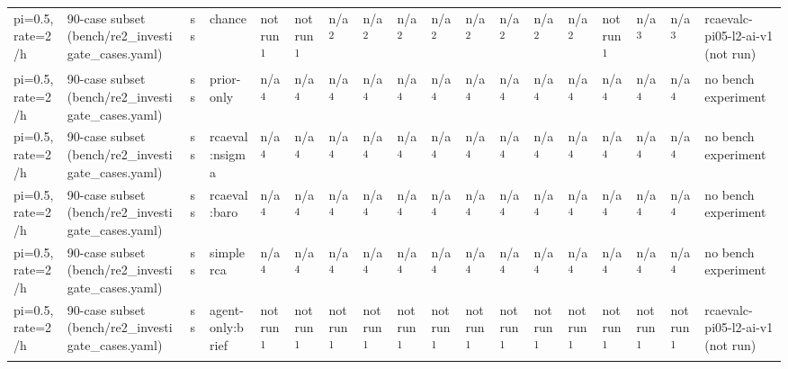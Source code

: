 \begin{table}[t]
\begin{tabular}{llllllllllllllllll}
pi=0.5, rate=2/h & 90-case subset (bench/re2\_investigate\_cases.yaml) & ss & chance & not run\textsuperscript{1} & not run\textsuperscript{1} & n/a\textsuperscript{2} & n/a\textsuperscript{2} & n/a\textsuperscript{2} & n/a\textsuperscript{2} & n/a\textsuperscript{2} & n/a\textsuperscript{2} & n/a\textsuperscript{2} & n/a\textsuperscript{2} & not run\textsuperscript{1} & n/a\textsuperscript{3} & n/a\textsuperscript{3} & rcaevalc-pi05-l2-ai-v1 (not run) \\
pi=0.5, rate=2/h & 90-case subset (bench/re2\_investigate\_cases.yaml) & ss & prior-only & n/a\textsuperscript{4} & n/a\textsuperscript{4} & n/a\textsuperscript{4} & n/a\textsuperscript{4} & n/a\textsuperscript{4} & n/a\textsuperscript{4} & n/a\textsuperscript{4} & n/a\textsuperscript{4} & n/a\textsuperscript{4} & n/a\textsuperscript{4} & n/a\textsuperscript{4} & n/a\textsuperscript{4} & n/a\textsuperscript{4} & no bench experiment \\
pi=0.5, rate=2/h & 90-case subset (bench/re2\_investigate\_cases.yaml) & ss & rcaeval:nsigma & n/a\textsuperscript{4} & n/a\textsuperscript{4} & n/a\textsuperscript{4} & n/a\textsuperscript{4} & n/a\textsuperscript{4} & n/a\textsuperscript{4} & n/a\textsuperscript{4} & n/a\textsuperscript{4} & n/a\textsuperscript{4} & n/a\textsuperscript{4} & n/a\textsuperscript{4} & n/a\textsuperscript{4} & n/a\textsuperscript{4} & no bench experiment \\
pi=0.5, rate=2/h & 90-case subset (bench/re2\_investigate\_cases.yaml) & ss & rcaeval:baro & n/a\textsuperscript{4} & n/a\textsuperscript{4} & n/a\textsuperscript{4} & n/a\textsuperscript{4} & n/a\textsuperscript{4} & n/a\textsuperscript{4} & n/a\textsuperscript{4} & n/a\textsuperscript{4} & n/a\textsuperscript{4} & n/a\textsuperscript{4} & n/a\textsuperscript{4} & n/a\textsuperscript{4} & n/a\textsuperscript{4} & no bench experiment \\
pi=0.5, rate=2/h & 90-case subset (bench/re2\_investigate\_cases.yaml) & ss & simplerca & n/a\textsuperscript{4} & n/a\textsuperscript{4} & n/a\textsuperscript{4} & n/a\textsuperscript{4} & n/a\textsuperscript{4} & n/a\textsuperscript{4} & n/a\textsuperscript{4} & n/a\textsuperscript{4} & n/a\textsuperscript{4} & n/a\textsuperscript{4} & n/a\textsuperscript{4} & n/a\textsuperscript{4} & n/a\textsuperscript{4} & no bench experiment \\
pi=0.5, rate=2/h & 90-case subset (bench/re2\_investigate\_cases.yaml) & ss & agent-only:brief & not run\textsuperscript{1} & not run\textsuperscript{1} & not run\textsuperscript{1} & not run\textsuperscript{1} & not run\textsuperscript{1} & not run\textsuperscript{1} & not run\textsuperscript{1} & not run\textsuperscript{1} & not run\textsuperscript{1} & not run\textsuperscript{1} & not run\textsuperscript{1} & not run\textsuperscript{1} & not run\textsuperscript{1} & rcaevalc-pi05-l2-ai-v1 (not run) \\

\end{tabular}
\end{table}
